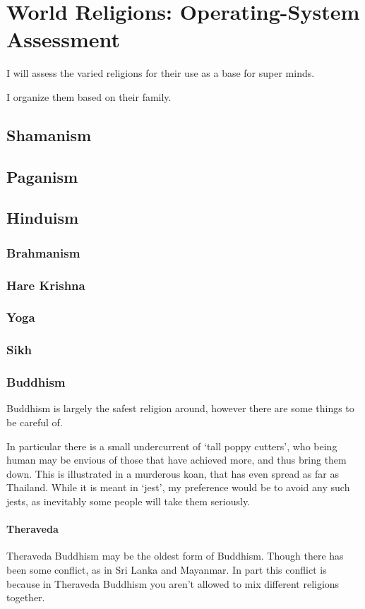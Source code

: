 \part{World Religions: Operating-System Assessment}\label{worldreligions}

I will assess the varied religions for their use as a base for super minds.

I organize them based on their family.  

\chapter{Shamanism}
\chapter{Paganism}
\chapter{Hinduism}
\section{Brahmanism}
\section{Hare Krishna}
\section{Yoga}
\section{Sikh}
\section{Buddhism}\label{Buddhism}
Buddhism is largely the safest religion around, however there are some things to
be careful of. 

In particular there is a small undercurrent of `tall poppy cutters', who being
human may be envious of those that have achieved more, and thus bring them down.
This is illustrated in a murderous koan, that has even spread as far as
Thailand. While it is meant in `jest', my preference would be to avoid any such
jests, as inevitably some people will take them seriously.  

\subsection{Theraveda}
Theraveda Buddhism may be the oldest form of Buddhism. Though there has been
some conflict, as in Sri Lanka and Mayanmar. 
In part this conflict is because in Theraveda Buddhism you aren't allowed to mix
different religions together. 

